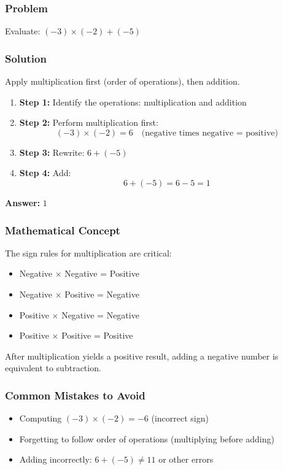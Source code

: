 \documentclass[12pt]{article}
\begin{document}
\subsubsection*{Problem}
Evaluate: $(-3) \times (-2) + (-5)$

\subsubsection*{Solution}

Apply multiplication first (order of operations), then addition.

\begin{enumerate}
\item \textbf{Step 1:} Identify the operations: multiplication and addition
\item \textbf{Step 2:} Perform multiplication first:
  \[
  (-3) \times (-2) = 6 \quad \text{(negative times negative = positive)}
  \]
\item \textbf{Step 3:} Rewrite: $6 + (-5)$
\item \textbf{Step 4:} Add:
  \[
  6 + (-5) = 6 - 5 = 1
  \]
\end{enumerate}

\textbf{Answer: } $1$

\subsubsection*{Mathematical Concept}
The sign rules for multiplication are critical:
\begin{itemize}
\item Negative $\times$ Negative = Positive
\item Negative $\times$ Positive = Negative
\item Positive $\times$ Negative = Negative
\item Positive $\times$ Positive = Positive
\end{itemize}
After multiplication yields a positive result, adding a negative number is equivalent to subtraction.

\subsubsection*{Common Mistakes to Avoid}
\begin{itemize}
\item Computing $(-3) \times (-2) = -6$ (incorrect sign)
\item Forgetting to follow order of operations (multiplying before adding)
\item Adding incorrectly: $6 + (-5) \neq 11$ or other errors
\end{itemize}
\end{document}

